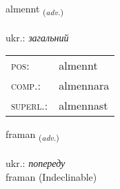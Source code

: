 \documentclass[frontgrid, backgrid]{flacards}\usepackage[]{graphicx}\usepackage[]{xcolor}
\begin{document}
\renewcommand{\flhead}{\vskip5pt \fboxsep=0pt {\small\bfseries\footnotesize Atviksorð | прислівник}}
\renewcommand{\fcfoot}{\vskip5pt \fboxsep=0pt \hspace{2pt}{\small\bfseries\footnotesize 1K}}

\renewcommand{\blhead}{\vskip5pt {\small\bfseries\footnotesize Atviksorð | прислівник }}
\renewcommand{\bcfoot}{\vskip5pt \hspace{2pt}{\small\bfseries\footnotesize 1K}}


{almennt \small{\textsubscript{(\textit{adv.})}} \\[1ex] %
\textphonetic{[almɛn̥t]} \\
ukr.: \emph{загальний} \\  [2ex]
\renewcommand*{\arraystretch}{0.8}
\begin{tabular}{ll}
\textsc{pos}: & almennt \\ 
\textsc{comp.}: & almennara \\ 
\textsc{superl.}: & almennast \\
\end{tabular}
}


\renewcommand{\flhead}{\vskip5pt \fboxsep=0pt {\small\bfseries\footnotesize Atviksorð | прислівник}}
\renewcommand{\fcfoot}{\vskip5pt \fboxsep=0pt \hspace{2pt}{\small\bfseries\footnotesize 1K}}

\renewcommand{\blhead}{\vskip5pt {\small\bfseries\footnotesize Atviksorð | прислівник }}
\renewcommand{\bcfoot}{\vskip5pt \hspace{2pt}{\small\bfseries\footnotesize 1K}}


{framan \small{\textsubscript{(\textit{adv.})}} \\[1ex]
\textphonetic{[fraːman]} \\
ukr.: \emph{попереду} \\  [2ex]
framan (Indeclinable)}

\renewcommand{\flhead}{\vskip5pt \fboxsep=0pt {\small\bfseries\footnotesize Nafnorð | іменник}}
\renewcommand{\fcfoot}{\vskip5pt \fboxsep=0pt \hspace{2pt}{\small\bfseries\footnotesize 1K}}
\end{document}
